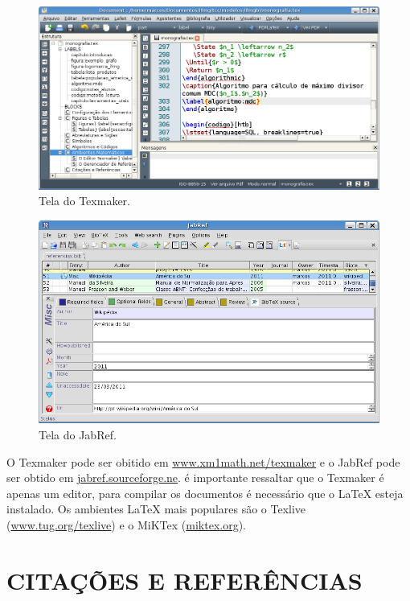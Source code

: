 \documentclass{templateppgmo}
\numberwithin{figure}{chapter}
\numberwithin{table}{chapter}
\numberwithin{quadro}{chapter}
\numberwithin{algoritmo}{chapter}
\numberwithin{codigo}{chapter}
\begin{document}
  	\begin{figure}[H]
  	\caption{Tela do Texmaker.}
  	\label{figura:texmaker}
  	\centering
  	\includegraphics[scale=.3]{figuras/texmaker}
  	\end{figure}

  	\begin{figure}[H]
  	\caption{Tela do JabRef.}
  	\label{figura:jabref}
  	\centering
  	\includegraphics[scale=.3]{figuras/jabref}
  	\end{figure}



  	O Texmaker pode ser obitido em \url{www.xm1math.net/texmaker} e o JabRef pode ser obtido em \url{jabref.sourceforge.ne}. é importante ressaltar que o Texmaker é apenas um editor, para compilar os documentos é necessário que o  \LaTeX \; esteja instalado. Os ambientes \LaTeX \; mais populares são o Texlive (\url{www.tug.org/texlive}) e o MiKTex (\url{miktex.org}).


  	\chapter{CITAÇÕES E REFERÊNCIAS}
\end{document}
